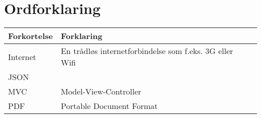 \chapter*{Ordforklaring}

\begin{tabularx}{\textwidth}{l l X} \hline
	\textbf{Forkortelse}  & \textbf{Forklaring} \\ \hline
	Internet&  En trådløs internetforbindelse som f.eks. 3G eller Wifi& \\
	JSON& & \\
	MVC& Model-View-Controller& \\
	PDF& Portable Document Format& \\ 
	
\end{tabularx}